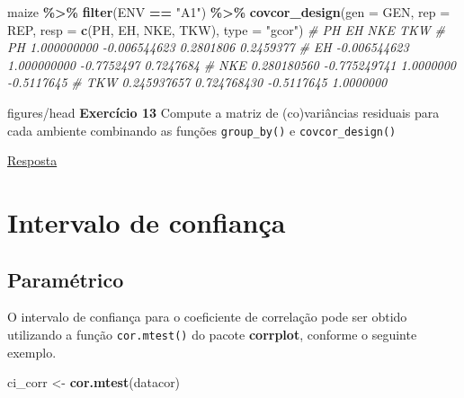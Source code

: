 \documentclass[
]{book}
\newenvironment{Shaded}{\begin{snugshade}}{\end{snugshade}}
\newcommand{\CommentTok}[1]{\textcolor[rgb]{0.56,0.35,0.01}{\textit{#1}}}
\newcommand{\DataTypeTok}[1]{\textcolor[rgb]{0.13,0.29,0.53}{#1}}
\newcommand{\KeywordTok}[1]{\textcolor[rgb]{0.13,0.29,0.53}{\textbf{#1}}}
\newcommand{\NormalTok}[1]{#1}
\newcommand{\OperatorTok}[1]{\textcolor[rgb]{0.81,0.36,0.00}{\textbf{#1}}}
\newcommand{\StringTok}[1]{\textcolor[rgb]{0.31,0.60,0.02}{#1}}
\numberwithin{equation}{section}
\newcommand{\indt}[1]{\index{#1|ST}}
\newenvironment{tarefa}
  {\begin{customBlockImage}[colframe=customOrange, title=Tarefa de casa]{figures/head}}
  {\end{customBlockImage}}
\begin{document}
\begin{Shaded}
\begin{Highlighting}[]
\NormalTok{maize }\OperatorTok{\%\textgreater{}\%}
\StringTok{  }\KeywordTok{filter}\NormalTok{(ENV }\OperatorTok{==}\StringTok{ "A1"}\NormalTok{) }\OperatorTok{\%\textgreater{}\%}
\StringTok{  }\KeywordTok{covcor\_design}\NormalTok{(}\DataTypeTok{gen =}\NormalTok{ GEN,}
                \DataTypeTok{rep =}\NormalTok{ REP,}
                \DataTypeTok{resp =} \KeywordTok{c}\NormalTok{(PH, EH, NKE, TKW),}
                \DataTypeTok{type =} \StringTok{"gcor"}\NormalTok{)}
\CommentTok{\#               PH           EH        NKE        TKW}
\CommentTok{\# PH   1.000000000 {-}0.006544623  0.2801806  0.2459377}
\CommentTok{\# EH  {-}0.006544623  1.000000000 {-}0.7752497  0.7247684}
\CommentTok{\# NKE  0.280180560 {-}0.775249741  1.0000000 {-}0.5117645}
\CommentTok{\# TKW  0.245937657  0.724768430 {-}0.5117645  1.0000000}
\end{Highlighting}
\end{Shaded}

\indt{Exercícios}
\begin{tarefa}
\textbf{Exercício 13}
Compute a matriz de (co)variâncias residuais para cada ambiente combinando as funções \texttt{group\_by()} e \texttt{covcor\_design()}
\end{tarefa}
\protect\hyperlink{exerc13}{Resposta}

\hypertarget{intervalo-de-confianuxe7a}{%
\section{Intervalo de confiança}\label{intervalo-de-confianuxe7a}}

\hypertarget{paramuxe9trico}{%
\subsection{Paramétrico}\label{paramuxe9trico}}

O intervalo de confiança para o coeficiente de correlação pode ser obtido utilizando a função \texttt{cor.mtest()} do pacote \textbf{corrplot}, conforme o seguinte exemplo.

\begin{Shaded}
\begin{Highlighting}[]
\NormalTok{ci\_corr \textless{}{-}}\StringTok{ }\KeywordTok{cor.mtest}\NormalTok{(datacor)}
\end{Highlighting}
\end{Shaded}
\end{document}
